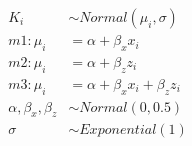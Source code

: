 \documentclass[10pt]{book}
\begin{document}
\begin{mdSnippets}
\begin{mdDisplaySnippet}[c16d8ee979e8ff0ba9dee008085fd2b6]%
\[%
\begin{aligned}
  K_i &\sim Normal(\mu_i, \sigma) \\
  m1: \mu_i &= \alpha + \beta_x x_i \\
  m2: \mu_i &= \alpha + \beta_z z_i\\
  m3: \mu_i &= \alpha + \beta_x x_i + \beta_z z_i \\
  \alpha, \beta_x, \beta_z &\sim Normal(0, 0.5) \\
  \sigma &\sim Exponential(1)
\end{aligned}
\]%
\end{mdDisplaySnippet}%

\end{mdSnippets}
\end{document}
